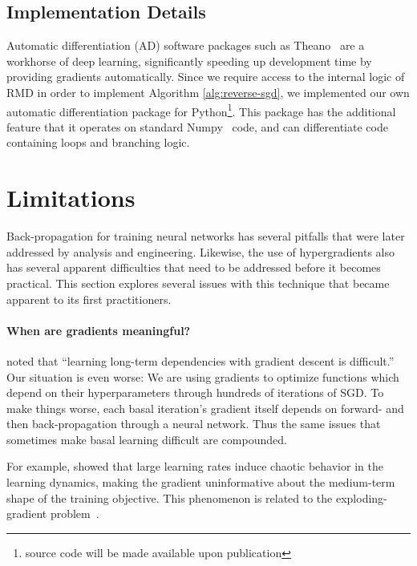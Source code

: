 \documentclass{article}
\newcommand{\primal}{basal}
\begin{document}
\subsection{Implementation Details}
Automatic differentiation (AD) software packages such as
Theano~\citep{Bastien-Theano-2012, bergstra2010scipy} are a workhorse of deep
learning, significantly speeding up development time by providing gradients
automatically. Since we require access to the internal logic of RMD in order to implement Algorithm \ref{alg:reverse-sgd}, we implemented
our own automatic differentiation package for Python\footnote{source code will be made available upon publication}.
This package has the additional feature that it operates on standard
Numpy~\citep{oliphant2007python} code, and can differentiate code containing
loops and branching logic.


\section{Limitations}

Back-propagation for training neural networks has several pitfalls that were later addressed by analysis and engineering.
Likewise, the use of hypergradients also has several apparent difficulties that need to be addressed before it becomes practical.
This section explores several issues with this technique that became apparent to its first practitioners.

\paragraph{When are gradients meaningful?}
\citet{bengio1994learning} noted that ``learning long-term dependencies with gradient descent is difficult.''
Our situation is even worse: We are using gradients to optimize functions which depend on their hyperparameters through hundreds of iterations of SGD.
To make things worse, each \primal{} iteration's gradient itself depends on forward- and then back-propagation through a neural network.
Thus the same issues that sometimes make \primal{} learning difficult are compounded.


For example, \citet*[Chapter 4]{pearlmutter1996investigation} showed that 
large learning rates induce chaotic behavior in the learning dynamics,
making the gradient uninformative about the medium-term shape of the training objective.
This phenomenon is related to the exploding-gradient problem~\cite{pascanu2012understanding}.
\end{document}
